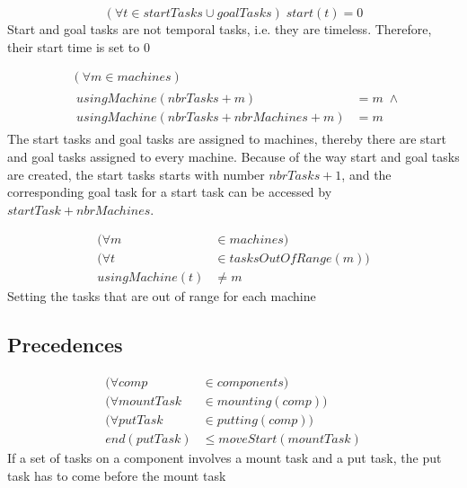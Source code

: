 \documentclass[10pt,a4paper]{report}
\begin{document}
\begin{equation}\label{eq:93}
(\forall t \in startTasks \cup goalTasks) \; start(t) = 0
\end{equation}
Start and goal tasks are not temporal tasks, i.e. they are timeless. Therefore, their start time is set to 0


\begin{equation}
\begin{aligned}\label{eq:94}
&(\forall m \in machines) \\
&\begin{aligned}
usingMachine(nbrTasks + m) &= m \; \land\\
usingMachine(nbrTasks + nbrMachines + m) &= m
\end{aligned}
\end{aligned}
\end{equation}
The start tasks and goal tasks are assigned to machines, thereby there are start and goal tasks assigned to every machine. Because of the way start and goal tasks are created, the start tasks starts with number $nbrTasks + 1$, and the corresponding goal task for a start task can be accessed by $startTask + nbrMachines$.

\begin{equation}\label{eq:95}
\begin{aligned}
(\forall m &\in machines) \\
(\forall t &\in tasksOutOfRange(m)) \\
usingMachine(t) &\neq m
\end{aligned}
\end{equation}
Setting the tasks that are out of range for each machine

\subsection*{Precedences}

\begin{equation}
\begin{aligned}\label{eq:96}
(\forall comp &\in components) \\
(\forall mountTask &\in mounting(comp)) \\
(\forall putTask &\in putting(comp)) \\
end(putTask) &\le moveStart(mountTask)
\end{aligned}
\end{equation}
If a set of tasks on a component involves a mount task and a put task, the put task has to come before the mount task
\end{document}

